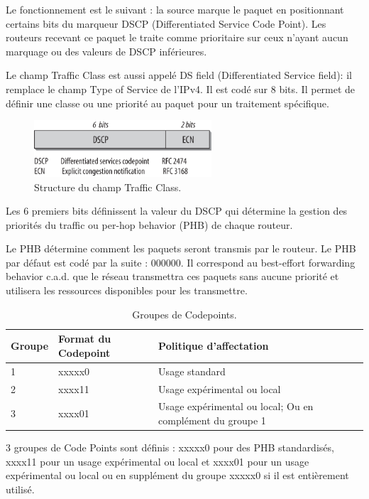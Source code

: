     Le fonctionnement est le suivant : la source marque le paquet en positionnant certains bits du marqueur DSCP (Differentiated Service Code Point).
    Les routeurs recevant ce paquet le traite comme prioritaire sur ceux n'ayant aucun marquage ou des valeurs de DSCP inférieures.
    
    Le champ Traffic Class est aussi appelé DS field (Differentiated Service field): il remplace le champ Type of Service de l'IPv4. Il est codé sur 8 bits. Il permet de définir une classe ou une priorité au paquet pour un traitement spécifique.
    
    \begin{figure}[h]
    \includegraphics[width=250px]{figures/trafficclass.png}
    \centering
    \caption{Structure du champ Traffic Class. \cite{Hagen2014}}
    \end{figure}
	
    
    Les 6 premiers bits définissent la valeur du DSCP  qui détermine la gestion des priorités du traffic ou per-hop behavior (PHB) de chaque routeur. 
    
    Le PHB détermine comment les paquets seront transmis par le routeur.
    Le PHB par défaut est codé par la suite : 000000. Il correspond au best-effort forwarding behavior c.a.d. que le réseau transmettra ces paquets sans aucune priorité et utilisera les ressources disponibles pour les transmettre.
    
    \begin{table}[!h]
  \centering
  \begin{tabular}{|l|l|l|} 
   \hline
    Groupe & Format du Codepoint & Politique d'affectation\\
    \hline
    1 & xxxxx0 & Usage standard \\
    \hline
    2 & xxxx11 & Usage expérimental ou local\\
    \hline
    3 & xxxx01 & Usage expérimental ou local; Ou en complément du groupe 1\\
    \hline
  \end{tabular}
  \caption{Groupes de Codepoints.}
\end{table}

    3 groupes de Code Points sont définis : xxxxx0 pour des PHB standardisés, xxxx11 pour un usage expérimental ou local et xxxx01 pour un usage expérimental ou local ou en supplément du groupe xxxxx0 si il est entièrement utilisé.
    

